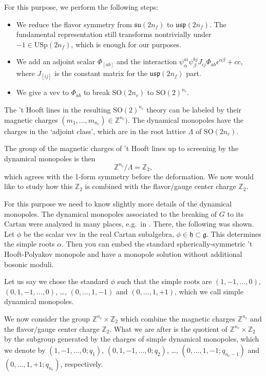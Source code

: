 \documentclass[12pt]{article}
\numberwithin{equation}{section}
\def\bZ{\mathbb{Z}}
\def\SO{\mathrm{SO}}
\def\USp{\mathrm{USp}}
\def\su{\mathfrak{su}}
\def\usp{\mathfrak{usp}}
\begin{document}
For this purpose, we perform the following steps:
\begin{itemize}
\item We reduce the flavor symmetry from $\su(2n_f)$ to $\usp(2n_f)$. 
The fundamental representation still transforms nontrivially under $-1\in \USp(2n_f)$, which is enough for our purposes.
\item We add an adjoint scalar $\Phi_{[ab]}$ and the interaction $\psi^{ai}_\alpha \psi^{bj}_\beta J_{ij} \Phi_{ab}\epsilon^{\alpha\beta} +cc$, where $J_{[ij]}$ is the constant matrix for the $\usp(2n_f)$ part.
\item We give a vev to $\Phi_{ab}$ to break $\SO(2n_c)$ to $\SO(2)^{n_c}$.
\end{itemize}

The 't Hooft lines in the resulting $\SO(2)^{n_c}$ theory can be labeled by their magnetic charges $(m_1,\ldots,m_{n_c})\in \bZ^{n_c})$.
The dynamical monopoles have the charges in the `adjoint class', which are
in the root lattice $\Lambda$ of $\SO(2n_c)$. 

The group of the magnetic charges of 't Hooft lines up to screening by the dynamical monopoles is then \begin{equation}
\bZ^{n_c}/\Lambda = \bZ_2,
\end{equation}
which agrees with the 1-form symmetry before the deformation.
We now would like to study how this $\bZ_2$ is combined with the flavor/gauge center charge $\bZ_2$.

For this purpose we need to know slightly more details of the dynamical monopoles.
The dynamical monopoles associated to the breaking of $G$ to its Cartan were analyzed in many places, 
e.g.~in \cite{Weinberg:1979zt}.
There, the following was shown.
Let $\phi$ be the scalar vev in the real Cartan subalgebra, $\phi\in \mathfrak{h}\subset \mathfrak{g}$.
This determines the simple roots $\alpha$.
Then you can embed the standard spherically-symmetric 't Hooft-Polyakov monopole and have a monopole solution without additional bosonic moduli. 

Let us say we chose the standard $\phi$ such that the simple roots are $(1,-1,\ldots,0)$,
$(0,1,-1,\ldots,0)$, \ldots, $(0,\ldots,1,-1)$ and $(0,\ldots,1,+1)$,
which we call simple dynamical monopoles.

We now consider the group $\bZ^{n_c}\times \bZ_2$ which combine the magnetic charges $\bZ^{n_c}$ and the flavor/gauge center charge $\bZ_2$.
What we are after is the quotient of $\bZ^{n_c}\times \bZ_2$ 
by the subgroup generated by the charges of simple dynamical monopoles,
which we denote by
$(1,-1,\ldots, 0; q_1)$, $(0,1,-1,\ldots, 0; q_2)$, \ldots,
$(0,\ldots, 1,-1; q_{n_c-1})$ and $(0,\ldots,1,+1; q_{n_c})$, respectively.
\end{document}
